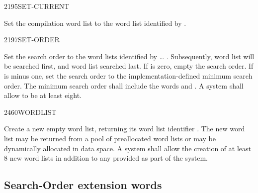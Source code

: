 \begin{worddef}{2195}{SET-CURRENT}
\item {}

	Set the compilation word list to the word list identified by
	.
\end{worddef}


\begin{worddef}{2197}{SET-ORDER}
\item {}

	Set the search order to the word lists identified by
	 {\ldots} . Subsequently, word list
	 will be searched first, and word list 
	searched last. If  is zero, empty the search order. If
	 is minus one, set the search order to the
	implementation-defined minimum search order. The minimum search
	order shall include the words  and
	. A system shall allow  to be at least
	eight.
\end{worddef}


\begin{worddef}{2460}{WORDLIST}
\item {}

	Create a new empty word list, returning its word list identifier
	. The new word list may be returned from a pool of
	preallocated word lists or may be dynamically allocated in data
	space. A system shall allow the creation of at least 8 new word
	lists in addition to any provided as part of the system.
\end{worddef}


\subsection{Search-Order extension words} %
\extended

